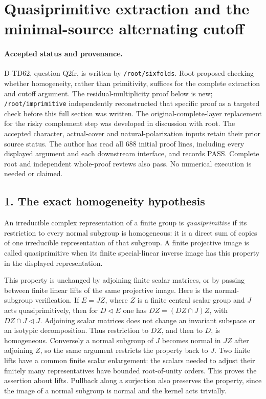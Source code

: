 \section{Quasiprimitive extraction and the minimal-source alternating cutoff}
\label{sec:quasiprimitive-extraction}

\paragraph{Accepted status and provenance.}
D-TD62, question Q2fr, is written by
\texttt{/root/sixfolds}. Root proposed checking whether homogeneity,
rather than primitivity, suffices for the complete extraction and
cutoff argument. The residual-multiplicity proof below is new;
\texttt{/root/imprimitive} independently reconstructed that specific
proof as a targeted check before this full section was written.
The original-complete-layer replacement for the risky complement
step was developed in discussion with root. The accepted character,
actual-cover and natural-polarization inputs retain their prior
source status. The author has read all 688 initial proof lines, including
every displayed argument and each downstream interface, and records PASS.
Complete root and independent whole-proof reviews also pass. No numerical
execution is needed or claimed.

\subsection*{1. The exact homogeneity hypothesis}

An irreducible complex representation of a finite group is
\emph{quasiprimitive} if its restriction to every normal subgroup
is homogeneous: it is a direct sum of copies of one irreducible
representation of that subgroup. A finite projective image is
called quasiprimitive when its finite special-linear inverse image
has this property in the displayed representation.

This property is unchanged by adjoining finite scalar matrices,
or by passing between finite linear lifts of the same projective
image. Here is the normal-subgroup verification. If
\(E=JZ\), where \(Z\) is a finite central scalar group and \(J\)
acts quasiprimitively, then for \(D\triangleleft E\) one has
\(DZ=(DZ\cap J)Z\), with \(DZ\cap J\triangleleft J\).
Adjoining scalar matrices does not change an invariant subspace
or an isotypic decomposition. Thus restriction to \(DZ\), and
then to \(D\), is homogeneous. Conversely a normal subgroup of
\(J\) becomes normal in \(JZ\) after adjoining \(Z\), so the
same argument restricts the property back to \(J\).
Two finite lifts have a common finite scalar enlargement:
the scalars needed to adjust their finitely many representatives
have bounded root-of-unity orders. This proves the assertion
about lifts. Pullback along a surjection also preserves the
property, since the image of a normal subgroup is normal and
the kernel acts trivially.

